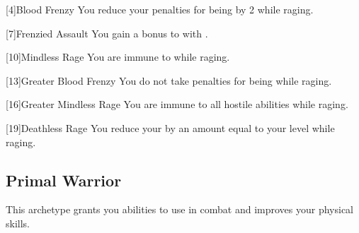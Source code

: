        [4]{Blood Frenzy}
        You reduce your penalties for being  by 2 while raging.

        [7]{Frenzied Assault}
        You gain a  bonus to  with .

        [10]{Mindless Rage}
        You are immune to   while raging.

        [13]{Greater Blood Frenzy} 
        You do not take penalties for being  while raging.

        [16]{Greater Mindless Rage} 
        You are immune to all hostile  abilities while raging.

        [19]{Deathless Rage} 
        You reduce your  by an amount equal to your level while raging.

    \subsection{Primal Warrior}
        This archetype grants you abilities to use in combat and improves your physical skills.

